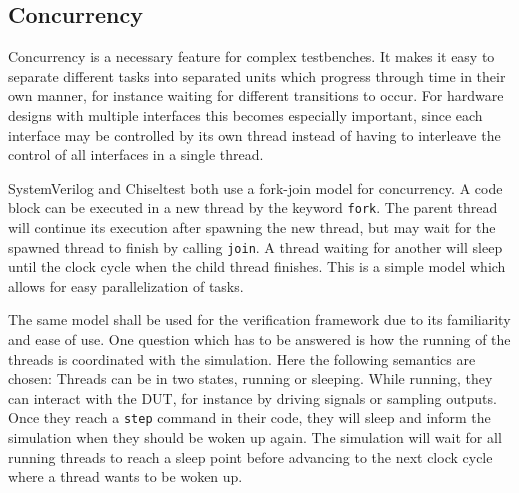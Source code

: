 \documentclass[11pt,a4paper]{report}
\newcommand{\ttt}{\texttt}
\begin{document}

\subsection{Concurrency} %

Concurrency is a necessary feature for complex testbenches. It makes it easy to separate different tasks into
separated units which progress through time in their own manner, for instance waiting for different transitions to
occur. For hardware designs with multiple interfaces this becomes especially important, since each interface may be
controlled by its own thread instead of having to interleave the control of all interfaces in a single thread.

SystemVerilog and Chiseltest both use a fork-join model for concurrency. A code block can be executed in a new thread
by the keyword \ttt{fork}. The parent thread will continue its execution after spawning the new thread, but may wait
for the spawned thread to finish by calling \ttt{join}. A thread waiting for another will sleep until the clock cycle
when the child thread finishes. This is a simple model which allows for easy parallelization of tasks.

The same model shall be used for the verification framework due to its familiarity and ease of use. One question
which has to be answered is how the running of the threads is coordinated with the simulation. Here the following
semantics are chosen: Threads can be in two states, running or sleeping. While running, they can interact with the
DUT, for instance by driving signals or sampling outputs. Once they reach a \ttt{step} command in their code, they
will sleep and inform the simulation when they should be woken up again. The simulation will wait for all running
threads to reach a sleep point before advancing to the next clock cycle where a thread wants to be woken up.
\end{document}
